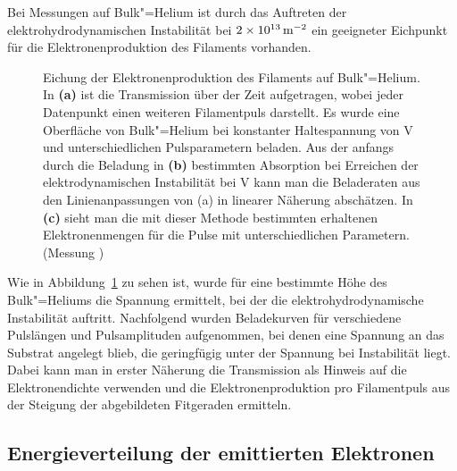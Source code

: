 Bei Messungen auf Bulk"=Helium ist durch das Auftreten der elektrohydrodynamischen Instabilität bei $\unit[2\times10^{13}]{\Em}$ ein geeigneter Eichpunkt für die Elektronenproduktion des Filaments vorhanden.
\begin{figure}[h!tbp]
	\centerline{}
	\centerline{%
%
}
	\caption[Eichung der Elektronenproduktion]{Eichung der Elektronenproduktion des Filaments auf Bulk"=Helium. In {\bfseries (a)} ist die Transmission über der Zeit aufgetragen, wobei jeder Datenpunkt einen weiteren Filamentpuls darstellt. Es wurde eine Oberfläche von Bulk"=Helium bei konstanter Haltespannung von \unit[100]{V} und unterschiedlichen Pulsparametern beladen. Aus der anfangs durch die Beladung in {\bfseries (b)} bestimmten Absorption bei Erreichen der elektrodynamischen Instabilität bei \unit[384]{V} kann man die Beladeraten aus den Linienanpassungen von (a) in linearer Näherung abschätzen. In {\bfseries (c)} sieht man die mit dieser Methode bestimmten erhaltenen Elektronenmengen für die Pulse mit unterschiedlichen Parametern. (Messung )}
	\label{fig:fil_eichung}
\end{figure}

Wie in Abbildung~\ref{fig:fil_eichung} zu sehen ist, wurde für eine bestimmte Höhe des Bulk"=Heliums die Spannung ermittelt, bei der die elektrohydrodynamische Instabilität auftritt. Nachfolgend wurden Beladekurven für verschiedene Pulslängen und Pulsamplituden aufgenommen, bei denen eine Spannung an das Substrat angelegt blieb, die geringfügig unter der Spannung bei Instabilität liegt. Dabei kann man in erster Näherung die Transmission als Hinweis auf die Elektronendichte verwenden und die Elektronenproduktion pro Filamentpuls aus der Steigung der abgebildeten Fitgeraden ermitteln.

\subsection{Energieverteilung der emittierten Elektronen}
\enlargethispage{2\baselineskip}

